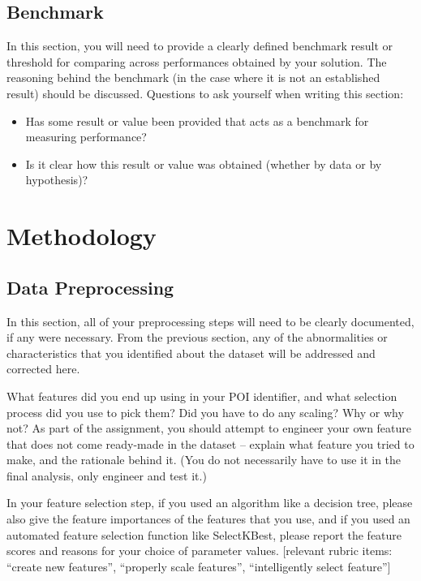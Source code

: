 \documentclass[twoside,openright,titlepage,numbers=noenddot,headinclude,%
               footinclude=true,cleardoublepage=empty,abstractoff,BCOR=5mm,%
               paper=a4,fontsize=11pt,ngerman,american]{scrreprt}
\numberwithin{theorem}{chapter}
\numberwithin{definition}{chapter}
\numberwithin{algorithm}{chapter}
\numberwithin{figure}{chapter}
\numberwithin{table}{chapter}
\numberwithin{equation}{chapter}
\begin{document}
\section*{Benchmark}

In this section, you will need to provide a clearly defined benchmark result or threshold for comparing across performances obtained by your solution. The reasoning behind the benchmark (in the case where it is not an established result) should be discussed. Questions to ask yourself when writing this section:
\begin{itemize}%
\item Has some result or value been provided that acts as a benchmark for measuring performance?
\item Is it clear how this result or value was obtained (whether by data or by hypothesis)?
\end{itemize}

\chapter*{Methodology}

\section*{Data Preprocessing}
In this section, all of your preprocessing steps will need to be clearly documented, if any were necessary. From the previous section, any of the abnormalities or characteristics that you identified about the dataset will be addressed and corrected here. 

What features did you end up using in your POI identifier, and what selection process did you use to pick them? Did you have to do any scaling? Why or why not? As part of the assignment, you should attempt to engineer your own feature that does not come ready-made in the dataset -- explain what feature you tried to make, and the rationale behind it. (You do not necessarily have to use it in the final analysis, only engineer and test it.) 

In your feature selection step, if you used an algorithm like a decision tree, please also give the feature importances of the features that you use, and if you used an automated feature selection function like SelectKBest, please report the feature scores and reasons for your choice of parameter values.  [relevant rubric items: ``create new features'', ``properly scale features'', ``intelligently select feature'']
\end{document}
